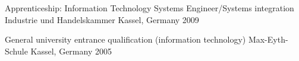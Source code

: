 

\begin{cventries}

  \cventry
    {Apprenticeship: Information Technology Systems Engineer/Systems integration} %
    {Industrie und Handelskammer} %
    {Kassel, Germany} %
    {2009} %

  \cventry
    {General university entrance qualification (information technology)} %
    {Max-Eyth-Schule} %
    {Kassel, Germany} %
    {2005} %
\end{cventries}

